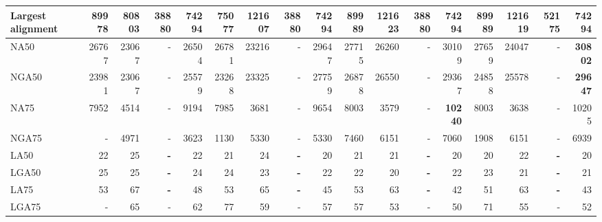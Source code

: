\documentclass[12pt,a4paper]{article}
\begin{document}
\begin{table}[ht]
\begin{center}
\begin{tabular}{|l*{16}{|r}|}
Largest alignment & 89978 & 80803 & 38880 & 74294 & 75077 & 121607 & 38880 & 74294 & 89989 & {\bf 121623} & 38880 & 74294 & 89989 & 121619 & 52175 & 74294 \\ \hline
NA50 & 26767 & 23067 & - & 26504 & 26781 & 23216 & - & 29647 & 27715 & 26260 & - & 30109 & 27659 & 24047 & - & {\bf 30802} \\ \hline
NGA50 & 23981 & 23067 & - & 25579 & 23268 & 23325 & - & 27759 & 26878 & 26550 & - & 29367 & 24858 & 25578 & - & {\bf 29647} \\ \hline
NA75 & 7952 & 4514 & - & 9194 & 7985 & 3681 & - & 9654 & 8003 & 3579 & - & {\bf 10240} & 8003 & 3638 & - & 10205 \\ \hline
NGA75 & - & 4971 & - & 3623 & 1130 & 5330 & - & 5330 & 7460 & 6151 & - & 7060 & 1908 & 6151 & - & 6939 \\ \hline
LA50 & 22 & 25 & {\bf -} & 22 & 21 & 24 & {\bf -} & 20 & 21 & 21 & {\bf -} & 20 & 20 & 22 & {\bf -} & 20 \\ \hline
LGA50 & 25 & 25 & {\bf -} & 24 & 24 & 23 & {\bf -} & 22 & 22 & 20 & {\bf -} & 22 & 23 & 21 & {\bf -} & 21 \\ \hline
LA75 & 53 & 67 & {\bf -} & 48 & 53 & 65 & {\bf -} & 45 & 53 & 63 & {\bf -} & 42 & 51 & 63 & {\bf -} & 43 \\ \hline
LGA75 & - & 65 & - & 62 & 77 & 59 & - & 57 & 57 & 53 & - & 50 & 71 & 55 & - & 52 \\ \hline
\end{tabular}
\end{center}
\end{table}
\end{document}
